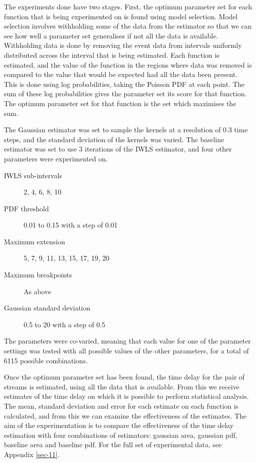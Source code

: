 \documentclass[a4paper,11pt]{article}
\begin{document}
The experiments done have two stages. First, the optimum parameter set for each
function that is being experimented on is found using model selection. Model
selection involves withholding some of the data from the estimator so that we
can see how well a parameter set generalises if not all the data is
available. Withholding data is done by removing the event data from intervals
uniformly distributed across the interval that is being estimated. Each function
is estimated, and the value of the function in the regions where data was
removed is compared to the value that would be expected had all the data been
present. This is done using log probabilities, taking the Poisson PDF at each
point. The sum of these log probabilities gives the parameter set its score for
that function. The optimum parameter set for that function is the set which
maximises the sum.

The Gaussian estimator was set to sample the kernels at a resolution of 0.3 time
steps, and the standard deviation of the kernels was varied. The baseline
estimator was set to use 3 iterations of the IWLS estimator, and four other
parameters were experimented on.
\begin{description}
\item[IWLS sub-intervals] 2, 4, 6, 8, 10
\item[PDF threshold] 0.01 to 0.15 with a step of 0.01
\item[Maximum extension] 5, 7, 9, 11, 13, 15, 17, 19, 20
\item[Maximum breakpoints] As above
\item[Gaussian standard deviation] 0.5 to 20 with a step of 0.5
\end{description}
 The parameters were co-varied, meaning that each value for one
of the parameter settings was tested with all possible values of the other
parameters, for a total of 6115 possible combinations.

Once the optimum parameter set has been found, the time delay
for the pair of streams is estimated, using all the data that is available. From
this we receive estimates of the time delay on which it is possible to perform
statistical analysis. The mean, standard deviation and error for each estimate
on each function is calculated, and from this we can examine the effectiveness
of the estimates. The aim of the experimentation is to compare the effectiveness
of the time delay estimation with four combinations of estimators: gaussian
area, gaussian pdf, baseline area and baseline pdf. For the full set of
experimental data, see Appendix \ref{sec-11}.
\end{document}
